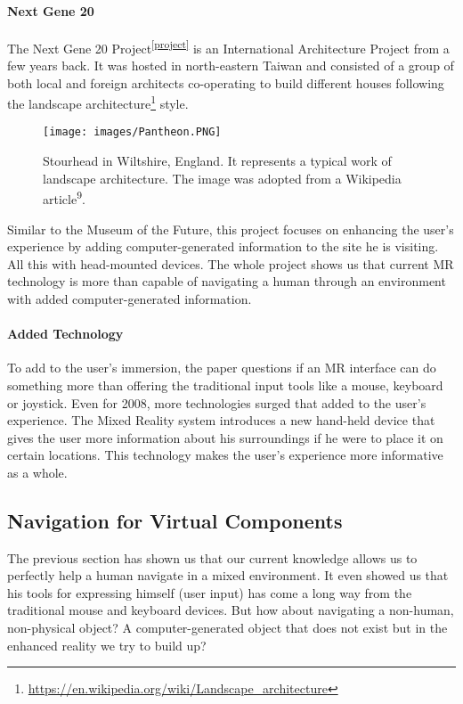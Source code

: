 \paragraph{Next Gene 20}
The Next Gene 20 Project\textsuperscript{\ref{project}} is an International Architecture Project from a few years back. It was hosted in north-eastern Taiwan and consisted of a group of both local and foreign architects co-operating to build different houses following the landscape architecture\footnote{\protect\url{https://en.wikipedia.org/wiki/Landscape\_architecture}}  style.
\begin{figure}[!htb]
	\texttt{[image: images/Pantheon.PNG]}
	\captionsetup{width=0.8\textwidth}
	\centering
	\caption{Stourhead in Wiltshire, England. It represents a typical work of landscape architecture. The image was adopted from a Wikipedia article\textsuperscript{9}.}
\end{figure}
Similar to the Museum of the Future\cite{hughes2004augmenting}, this project focuses on enhancing the user's experience by adding computer-generated information to the site he is visiting. All this with head-mounted devices. The whole project shows us that current MR technology is more than capable of navigating a human through an environment with added computer-generated information. \newline

\paragraph{Added Technology}
To add to the user's immersion, the paper questions if an MR interface can do something more than offering the traditional input tools like a mouse, keyboard or joystick. Even for 2008, more technologies surged that added to the user's experience.\newline
The Mixed Reality system introduces a new hand-held device that gives the user more information about his surroundings if he were to place it on certain locations.  This technology makes the user's experience more informative as a whole.

\subsection{Navigation for Virtual Components}
The previous section has shown us that our current knowledge allows us to perfectly help a human navigate in a mixed environment. It even showed us that his tools for expressing himself (user input) has come a long way from the traditional mouse and keyboard devices.
But how about navigating a non-human, non-physical object? A computer-generated object that does not exist but in the enhanced reality we try to build up?

